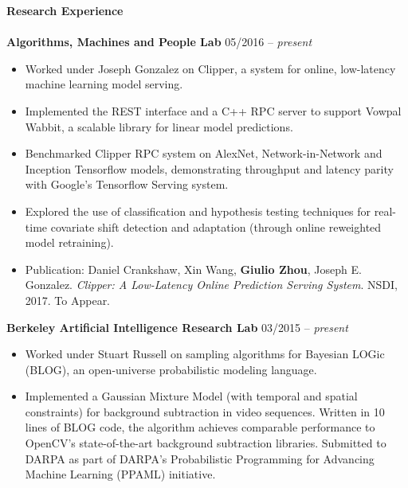 \documentclass{article}
\begin{document}
\noindent
\textbf{{\Large Research Experience}}\\[-2mm]
\HRule\\
\noindent
\textbf{Algorithms, Machines and People Lab}
\hfill 05/2016 -- \textit{present}
\begin{itemize}
\vspace{-2.5mm}
\item Worked under Joseph Gonzalez on Clipper, a system for online, low-latency machine learning model serving.
\vspace{-2.5mm}
\item Implemented the REST interface and a C++ RPC server to support Vowpal Wabbit, a scalable library for linear model predictions.
\vspace{-2.5mm}
\item Benchmarked Clipper RPC system on AlexNet, Network-in-Network and Inception Tensorflow models, demonstrating throughput and latency parity with Google's Tensorflow Serving system.
\vspace{-2.5mm}
\item Explored the use of classification and hypothesis testing techniques for real-time covariate shift detection and adaptation (through online reweighted model retraining).
\vspace{-2.5mm}
\item Publication: Daniel Crankshaw, Xin Wang, \textbf{Giulio Zhou}, Joseph E. Gonzalez. \textit{Clipper: A Low-Latency Online Prediction Serving System}. NSDI, 2017. To Appear.
\end{itemize}
\vspace{-2mm}

\noindent
\textbf{Berkeley Artificial Intelligence Research Lab}
\hfill 03/2015 -- \textit{present}
\begin{itemize}
\vspace{-2.5mm}
\item Worked under Stuart Russell on sampling algorithms for Bayesian LOGic (BLOG), an open-universe probabilistic modeling language.
\vspace{-2.5mm}
\item Implemented a Gaussian Mixture Model (with temporal and spatial constraints) for background subtraction in video sequences. Written in 10 lines of BLOG code, the algorithm achieves comparable performance to OpenCV's state-of-the-art background subtraction libraries. Submitted to DARPA as part of DARPA's Probabilistic Programming for Advancing Machine Learning (PPAML) initiative.
\end{itemize}
\vspace{-2mm}
\end{document}
